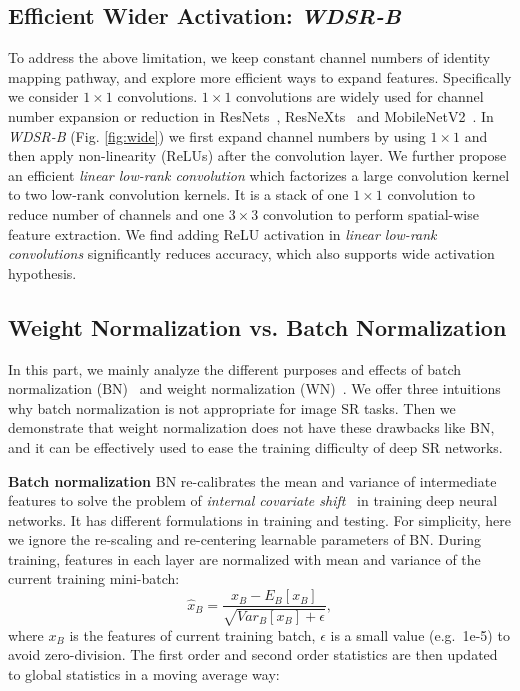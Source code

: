 \documentclass{article}
\begin{document}
\subsection{Efficient Wider Activation: \textit{WDSR-B}}
To address the above limitation, we keep constant channel numbers of identity mapping pathway, and explore more efficient ways to expand features. Specifically we consider \(1 \times 1\) convolutions. \(1 \times 1\) convolutions are widely used for channel number expansion or reduction in ResNets~\cite{he2016deep}, ResNeXts~\cite{xie2017aggregated} and MobileNetV2~\cite{2018arXiv180104381S}. In \textit{WDSR-B} (Fig. \ref{fig:wide}) we first expand channel numbers by using \(1 \times 1\) and then apply non-linearity (ReLUs) after the convolution layer. We further propose an efficient \textit{linear low-rank convolution} which factorizes a large convolution kernel to two low-rank convolution kernels. It is a stack of one \(1 \times 1\) convolution to reduce number of channels and one \(3 \times 3\) convolution to perform spatial-wise feature extraction. We find adding ReLU activation in \textit{linear low-rank convolutions} significantly reduces accuracy, which also supports wide activation hypothesis.

\subsection{Weight Normalization vs. Batch Normalization}

In this part, we mainly analyze the different purposes and effects of batch normalization (BN)~\cite{ioffe2015batch} and weight normalization (WN)~\cite{salimans2016weight}. We offer three intuitions why batch normalization is not appropriate for image SR tasks. Then we demonstrate that weight normalization does not have these drawbacks like BN, and it can be effectively used to ease the training difficulty of deep SR networks.

\textbf{Batch normalization} BN re-calibrates the mean and variance of intermediate features to solve the problem of \textit{internal covariate shift}~\cite{ioffe2015batch} in training deep neural networks. It has different formulations in training and testing. For simplicity, here we ignore the re-scaling and re-centering learnable parameters of BN. During training, features in each layer are normalized with mean and variance of the current training mini-batch:
\begin{equation}
\hat x_B = \frac{x_B - E_B[x_B]}{\sqrt{Var_B[x_B]+\epsilon}},
\end{equation}
where \(x_B\) is the features of current training batch, \(\epsilon\) is a small value (e.g.\ 1e-5) to avoid zero-division. The first order and second order statistics are then updated to global statistics in a moving average way:
\end{document}
